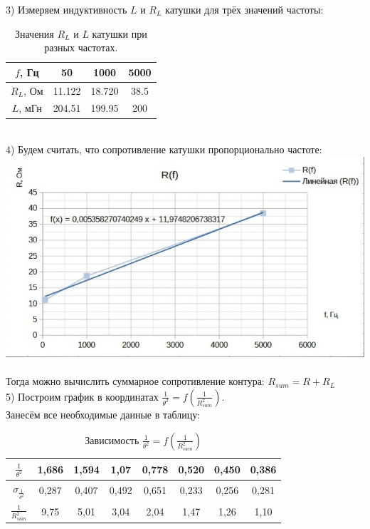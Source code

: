 \documentclass[11pt]{article}
\begin{document}
3) Измеряем индуктивность $L$ и $R_L$ катушки для трёх значений частоты:\\
\begin{table}[h]
\centering
\begin{tabular}{|c|c|c|c|}
\hline
$f$, Гц  & 50    & 1000  & 5000  \\ \hline
$R_L$, Ом & 11.122 & 18.720 & 38.5 \\ \hline
$L$, мГн & 204.51 & 199.95 & 200 \\ \hline
\end{tabular}
\caption{Значения $R_L$ и $L$ катушки при разных частотах.}
\end{table}\\
4) Будем считать, что сопротивление катушки пропорционально частоте:\\
\includegraphics[width=15cm]{g5}\\
\\
Тогда можно вычислить суммарное сопротивление контура: $R_{sum} = R + R_L$\\
5) Построим график в координатах $\frac{1}{\theta^2} = f(\frac{1}{R_{sum}^2})$.\\
Занесём все необходимые данные в таблицу:
\begin{table}[h]
\centering
\begin{tabular}{|c|c|c|c|c|c|c|c|}
\hline
$\frac{1}{\theta^2}$ & 1,686 & 1,594 & 1,07 & 0,778 & 0,520 & 0,450 & 0,386\\ \hline
$\sigma_{\frac{1}{\theta^2}}$ & 0,287 & 0,407 & 0,492 & 0,651 & 0,233 & 0,256 & 0,281\\ \hline 
$\frac{1}{R_{sum}^2}$ & 9,75 & 5,01 & 3,04 & 2,04 & 1,47 & 1,26 & 1,10\\ \hline
\end{tabular}
\caption{Зависимость $\frac{1}{\theta^2} = f(\frac{1}{R_{sum}^2})$ }
\end{table}\\
\end{document}
